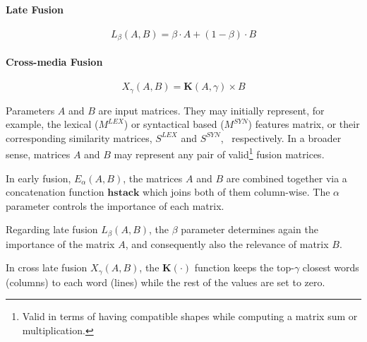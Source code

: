 \documentclass{llncs}
\begin{document}
\paragraph{Late Fusion}
\begin{equation}
L_\beta(A,B) = \beta \cdot A + (1 - \beta)\cdot B
\end{equation}
\paragraph{Cross-media Fusion}
\begin{equation}
X_{\gamma}(A,B) = \mathbf{K}(A,\gamma) \times B
\end{equation}


Parameters $A$ and $B$ are input matrices. They may initially represent, for example,  the lexical ($M^{LEX}$) or syntactical based ($M^{SYN}$) features matrix, or their  corresponding similarity matrices, $S^{LEX}$ and  $S^{SYN}$, ~respectively. In a broader sense, matrices $A$ and $B$ may represent any pair of valid\footnote{Valid in terms of having compatible shapes while computing a matrix sum or multiplication.} fusion matrices. 

In early fusion, $E_\alpha(A,B)$, the matrices $A$ and $B$ are combined together via a concatenation function $\mathbf{hstack}$ which joins both of them column-wise. The $\alpha$ parameter controls the importance of each matrix.

Regarding late fusion $L_\beta(A,B)$, the  $\beta$ parameter determines again the importance of the  matrix $A$,  and consequently also the relevance of matrix $B$.

In cross late fusion $X_\gamma(A,B)$, the $\mathbf{K}(\cdot)$ function keeps the top-$\gamma$ closest words (columns) to each word (lines) while the rest of the values are set to zero.
\end{document}
